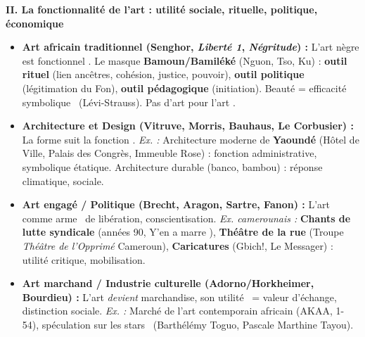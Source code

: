 \documentclass[11pt]{article}
\begin{document}
\begin{corrige}
\textbf{II. La fonctionnalité de l'art : utilité sociale, rituelle, politique, économique}
\begin{itemize}
\item \textbf{Art africain traditionnel (Senghor, \emph{Liberté 1}, \emph{Négritude}) :} \guillemotleft L'art nègre est fonctionnel \guillemotright. Le masque \textbf{Bamoun/Bamiléké} (Nguon, Tso, Ku) : \textbf{outil rituel} (lien ancêtres, cohésion, justice, pouvoir), \textbf{outil politique} (légitimation du Fon), \textbf{outil pédagogique} (initiation). Beauté = \guillemotleft efficacité symbolique \guillemotright\ (Lévi-Strauss). Pas d'art \guillemotleft pour l'art \guillemotright.
\item \textbf{Architecture et Design (Vitruve, Morris, Bauhaus, Le Corbusier) :} \guillemotleft La forme suit la fonction \guillemotright. \emph{Ex. :} Architecture moderne de \textbf{Yaoundé} (Hôtel de Ville, Palais des Congrès, Immeuble Rose) : fonction administrative, symbolique étatique. Architecture durable (banco, bambou) : réponse climatique, sociale.
\item \textbf{Art engagé / Politique (Brecht, Aragon, Sartre, Fanon) :} L'art comme \guillemotleft arme \guillemotright\ de libération, conscientisation. \emph{Ex. camerounais :} \textbf{Chants de lutte syndicale} (années 90, \guillemotleft Y'en a marre \guillemotright), \textbf{Théâtre de la rue} (Troupe \emph{Théâtre de l'Opprimé} Cameroun), \textbf{Caricatures} (Gbich!, Le Messager) : utilité critique, mobilisation.
\item \textbf{Art marchand / Industrie culturelle (Adorno/Horkheimer, Bourdieu) :} L'art \emph{devient} marchandise, son \guillemotleft utilité \guillemotright\ = valeur d'échange, distinction sociale. \emph{Ex. :} Marché de l'art contemporain africain (AKAA, 1-54), spéculation sur les \guillemotleft stars \guillemotright\ (Barthélémy Toguo, Pascale Marthine Tayou).
\end{itemize}


\end{corrige}
\end{document}
